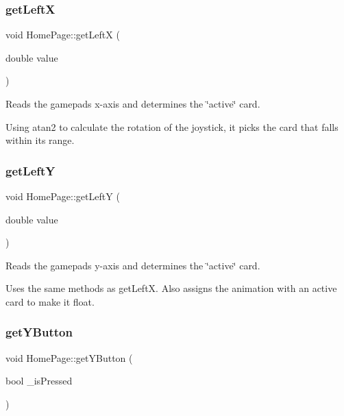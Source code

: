 \subsubsection{\texorpdfstring{getLeftX}{getLeftX}}
{\footnotesize\ttfamily void Home\+Page\+::get\+LeftX (\begin{DoxyParamCaption}\item[{double}]{value }\end{DoxyParamCaption})\hspace{0.3cm}{\ttfamily [slot]}}

Reads the gamepad\textquotesingle{}s x-\/axis and determines the \char`\"{}active\char`\"{} card.

Using atan2 to calculate the rotation of the joystick, it picks the card that falls within its range. \mbox{\label{classHomePage_a38c909855e6b1e1a0739642949aa4f9a}} 
\subsubsection{\texorpdfstring{getLeftY}{getLeftY}}
{\footnotesize\ttfamily void Home\+Page\+::get\+LeftY (\begin{DoxyParamCaption}\item[{double}]{value }\end{DoxyParamCaption})\hspace{0.3cm}{\ttfamily [slot]}}

Reads the gamepad\textquotesingle{}s y-\/axis and determines the \char`\"{}active\char`\"{} card.

Uses the same methods as get\+LeftX. Also assigns the animation with an active card to make it float. \mbox{\label{classHomePage_a8b38e0816ef5b863f13de62848a79d1e}} 
\subsubsection{\texorpdfstring{getYButton}{getYButton}}
{\footnotesize\ttfamily void Home\+Page\+::get\+Y\+Button (\begin{DoxyParamCaption}\item[{bool}]{\+\_\+is\+Pressed }\end{DoxyParamCaption})\hspace{0.3cm}{\ttfamily [slot]}}

